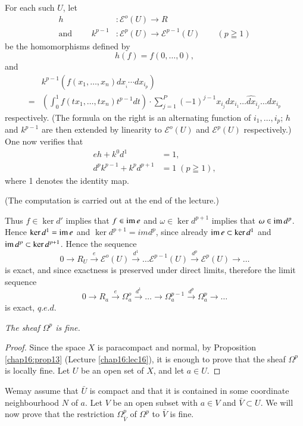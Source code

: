 For each such $U$, let
 \begin{align*}
h  & : \mathscr{E}^o (U) \to R  \\
\text{and } \qquad  k^{p-1}  & : \mathscr{E}^p (U) \to
\mathscr{E}^{p-1} (U) \qquad (p \geqq 1 )
 \end{align*}
   be the homomorphisms defined by
 $$
 h (f) = f (0, \ldots, 0), 
  $$
and
\begin{align*}
&k^{p-1} ( f (x_1, \ldots , x_n) dx_{_{i}} \cdots dx_{i_{p}} ) \\ 
= &( \int^1_0 f ( tx_1, \ldots, tx_n) t^{p-1} dt ) \cdot\sum^P_{j=1} ( -1
)^{j-1} x_{i_{j}} dx_{i_{1}} \dots \hat{dx}_{i_{j}} \dots dx_{i_{p}} 
\end{align*}\pageoriginale
respectively. (The formula on the right is an alternating function of
$ i_1,\ldots, i_p $; $h$ and  $k^{p-1} $ are then extended by
linearity to $\mathscr{E}^o (U) $ and  $ \mathscr{E}^p (U)$
respectively.) One now verifies that 
\begin{align*}
e h + k^0 d^1 & =  1,\\
d^p k^{p-1} + k^p d^{p+1} & = 1 \; ( p  \geqq 1 ),
\end{align*}
where 1 denotes the identity map.

(The computation is carried out at the end of the lecture.)

Thus $ f \in \ker d'$ implies that $ f \in \operatorname{im} e$
and $ \omega \in  \ker d^{p+1}$ implies that $ \omega \in  \operatorname{im}
d^p $. Hence $ \ker d^1 = \operatorname{im} e $ and  $ \ker d^{p+1}  = im d^p$,
since already $ \operatorname{im} e \subset \ker d^1 $ and $ \operatorname{im} d^p \subset \ker
d^{p+1}$. Hence the  sequence  
$$
0 \rightarrow R_U \xrightarrow{e} \mathscr{E}^o (U) \xrightarrow{d^1}
\dots \mathscr{E}^{p-1} (U) \xrightarrow{d^p} \mathscr{E}^p (U)
\rightarrow \dots  
$$
is exact, and since exactness is preserved under direct limits,
therefore the limit sequence 
$$
0 \rightarrow R_a  \xrightarrow{e} \Omega^o_a \xrightarrow{d^1} \dots
\rightarrow \Omega^{p-1}_a \xrightarrow{d^p} \Omega^p_a \rightarrow
\dots 
$$
is exact, $q.e.d$.

\textit{The sheaf $\Omega^p$ is fine.}

\begin{proof}%
Since the space $X$ is paracompact and normal, by Proposition
\ref{chap16:prop13} 
(Lecture \ref{chap16:lec16}), it is enough to prove that the sheaf $
\Omega^p $ is  
locally fine. Let $U$ be an open set of $X$, and let  $ a \in U $. 
\end{proof} 

We\pageoriginale may assume that $ \bar{U} $ is  compact and that it
is contained in 
some coordinate neighbourhood $N$ of $a$. Let $V$ be an open subset with
$ a \in V $ and $ \bar{V} \subset U $. We will now prove that the
restriction $ \Omega^p_{\bar{V}} $ of $ \Omega^p $ to  $ \bar{V} $ is
fine. 
 
